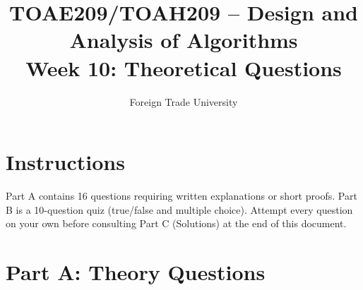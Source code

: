 \documentclass[11pt]{article}
\title{TOAE209/TOAH209 -- Design and Analysis of Algorithms\\[4pt]
\large Week 10: Theoretical Questions}
\author{Foreign Trade University}
\date{}
\begin{document}
\maketitle

\section*{Instructions}

Part A contains 16 questions requiring written explanations or short proofs. Part B is a
10-question quiz (true/false and multiple choice). Attempt every question on your own
before consulting Part C (Solutions) at the end of this document.

\section*{Part A: Theory Questions}
\end{document}
